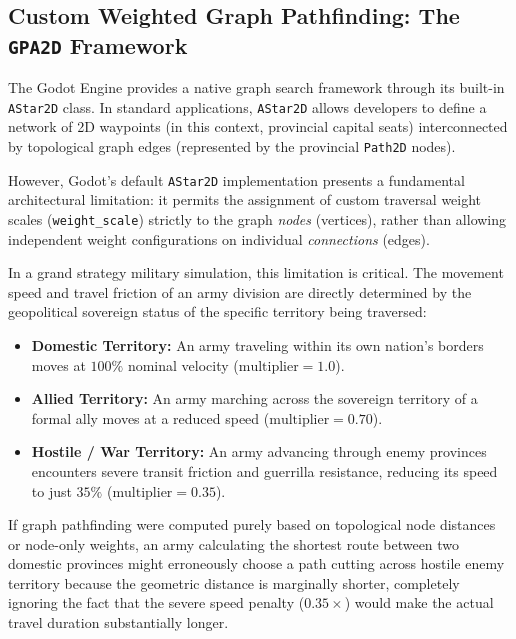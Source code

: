 \subsection{Custom Weighted Graph Pathfinding: The \texttt{GPA2D} Framework}
\label{subsec:gpa2d_pathfinding}

The Godot Engine provides a native graph search framework through its built-in \texttt{AStar2D} class. In standard applications, \texttt{AStar2D} allows developers to define a network of 2D waypoints (in this context, provincial capital seats) interconnected by topological graph edges (represented by the provincial \texttt{Path2D} nodes). 

However, Godot's default \texttt{AStar2D} implementation presents a fundamental architectural limitation: it permits the assignment of custom traversal weight scales (\texttt{weight\_scale}) strictly to the graph \textit{nodes} (vertices), rather than allowing independent weight configurations on individual \textit{connections} (edges).

In a grand strategy military simulation, this limitation is critical. The movement speed and travel friction of an army division are directly determined by the geopolitical sovereign status of the specific territory being traversed:
\begin{itemize}
    \item \textbf{Domestic Territory:} An army traveling within its own nation's borders moves at $100\%$ nominal velocity ($\text{multiplier} = 1.0$).
    \item \textbf{Allied Territory:} An army marching across the sovereign territory of a formal ally moves at a reduced speed ($\text{multiplier} = 0.70$).
    \item \textbf{Hostile / War Territory:} An army advancing through enemy provinces encounters severe transit friction and guerrilla resistance, reducing its speed to just $35\%$ ($\text{multiplier} = 0.35$).
\end{itemize}

If graph pathfinding were computed purely based on topological node distances or node-only weights, an army calculating the shortest route between two domestic provinces might erroneously choose a path cutting across hostile enemy territory because the geometric distance is marginally shorter, completely ignoring the fact that the severe speed penalty ($0.35\times$) would make the actual travel duration substantially longer. 

